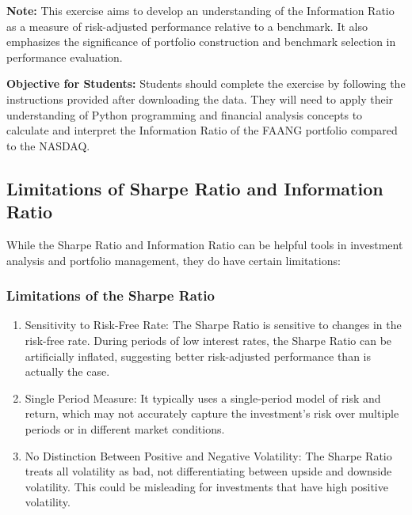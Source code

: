 \documentclass{article}
\begin{document}
\begin{enumerate}
    \textbf{Note:} This exercise aims to develop an understanding of the Information Ratio as a measure of risk-adjusted performance relative to a benchmark. It also emphasizes the significance of portfolio construction and benchmark selection in performance evaluation.
\end{enumerate}

\textbf{Objective for Students:} Students should complete the exercise by following the instructions provided after downloading the data. They will need to apply their understanding of Python programming and financial analysis concepts to calculate and interpret the Information Ratio of the FAANG portfolio compared to the NASDAQ.

\subsection{Limitations of Sharpe Ratio and Information Ratio}

While the Sharpe Ratio and Information Ratio can be helpful tools in investment analysis and portfolio management, they do have certain limitations:

\subsubsection{Limitations of the Sharpe Ratio}
\begin{enumerate}
    \item Sensitivity to Risk-Free Rate: The Sharpe Ratio is sensitive to changes in the risk-free rate. During periods of low interest rates, the Sharpe Ratio can be artificially inflated, suggesting better risk-adjusted performance than is actually the case.
    \item Single Period Measure: It typically uses a single-period model of risk and return, which may not accurately capture the investment's risk over multiple periods or in different market conditions.
    \item No Distinction Between Positive and Negative Volatility: The Sharpe Ratio treats all volatility as bad, not differentiating between upside and downside volatility. This could be misleading for investments that have high positive volatility.
\end{enumerate}
\end{document}
